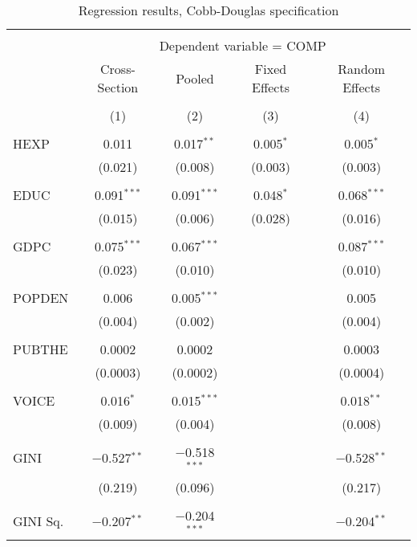 \documentclass[12pt,a4paper]{article}\usepackage[]{graphicx}\usepackage[]{color}
\begin{document}
\begin{table}[!htbp] \centering 
  \caption{Regression results, Cobb-Douglas specification} 
  \label{tab:bigcb} 
\footnotesize 
\begin{tabular}{@{\extracolsep{5pt}}lcccc} 
\\[-1.8ex]\hline 
\hline \\[-1.8ex] 
 & \multicolumn{4}{c}{Dependent variable = COMP} \\ 
\cline{2-5} 
 & Cross-Section & Pooled & Fixed Effects & Random Effects \\ 
\\[-1.8ex] & (1) & (2) & (3) & (4)\\ 
\hline \\[-1.8ex] 
 HEXP & 0.011 & 0.017$^{**}$ & 0.005$^{*}$ & 0.005$^{*}$ \\ 
  & (0.021) & (0.008) & (0.003) & (0.003) \\ 
  & & & & \\ 
 EDUC & 0.091$^{***}$ & 0.091$^{***}$ & 0.048$^{*}$ & 0.068$^{***}$ \\ 
  & (0.015) & (0.006) & (0.028) & (0.016) \\ 
  & & & & \\ 
 GDPC & 0.075$^{***}$ & 0.067$^{***}$ &  & 0.087$^{***}$ \\ 
  & (0.023) & (0.010) &  & (0.010) \\ 
  & & & & \\ 
 POPDEN & 0.006 & 0.005$^{***}$ &  & 0.005 \\ 
  & (0.004) & (0.002) &  & (0.004) \\ 
  & & & & \\ 
 PUBTHE & 0.0002 & 0.0002 &  & 0.0003 \\ 
  & (0.0003) & (0.0002) &  & (0.0004) \\ 
  & & & & \\ 
 VOICE & 0.016$^{*}$ & 0.015$^{***}$ &  & 0.018$^{**}$ \\ 
  & (0.009) & (0.004) &  & (0.008) \\ 
  & & & & \\ 
 GINI & $-$0.527$^{**}$ & $-$0.518$^{***}$ &  & $-$0.528$^{**}$ \\ 
  & (0.219) & (0.096) &  & (0.217) \\ 
  & & & & \\ 
 GINI Sq. & $-$0.207$^{**}$ & $-$0.204$^{***}$ &  & $-$0.204$^{**}$ \\ 

\end{tabular}
\end{table}
\end{document}
